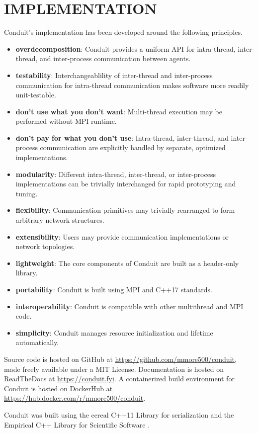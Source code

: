 \section{ IMPLEMENTATION }

Conduit's implementation has been developed around the following principles.

\begin{itemize}
    \item \textbf{overdecomposition}: Conduit provides a uniform API for intra-thread, inter-thread, and inter-process communication between agents.
    \item \textbf{testability}: Interchangeablility of inter-thread and inter-process communication for intra-thread communication makes software more readily unit-testable.
    \item \textbf{don't use what you don't want}: Multi-thread execution may be performed without MPI runtime.
    \item \textbf{don't pay for what you don't use}: Intra-thread, inter-thread, and inter-process communication are explicitly handled by separate, optimized implementations. 
    \item \textbf{modularity}: Different intra-thread, inter-thread, or inter-process implementations can be trivially interchanged for rapid prototyping and tuning.
    \item \textbf{flexibility}: Communication primitives may trivially rearranged to form arbitrary network structures. 
    \item \textbf{extensibility}: Users may provide communication implementations or network topologies.
    \item \textbf{lightweight}: The core components of Conduit are built as a header-only library.
    \item \textbf{portability}: Conduit is built using MPI and C++17 standards.
    \item \textbf{interoperability}: Conduit is compatible with other multithread and MPI code.
    \item \textbf{simplicity}: Conduit manages resource initialization and lifetime automatically.
\end{itemize}

Source code is hosted on GitHub at \url{https://github.com/mmore500/conduit}, made freely available under a MIT License.
Documentation is hosted on ReadTheDocs at \url{https://conduit.fyi}.
A containerized build environment for Conduit is hosted on DockerHub at \url{https://hub.docker.com/r/mmore500/conduit}.

Conduit was built using the cereal C++11 Library for serialization \cite{voorhies2017cereal} and the Empirical C++ Library for Scientific Software \cite{charles_ofria_2019_2575607}.